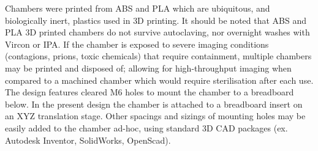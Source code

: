 Chambers were printed from ABS and PLA which are ubiquitous, and biologically inert, plastics used in \gls{3D printing}.
It should be noted that ABS and PLA 3D printed chambers do not survive autoclaving, nor overnight washes with Vircon or IPA.\@
If the chamber is exposed to severe imaging conditions (contagions, prions, toxic chemicals) that require containment, multiple chambers may be printed and disposed of; allowing for high-throughput imaging when compared to a machined chamber which would require sterilisation after each use.
The design features cleared M6 holes to mount the chamber to a breadboard below.
In the present design the chamber is attached to a breadboard insert on an XYZ translation stage.
Other spacings and sizings of mounting holes may be easily added to the chamber ad-hoc, using standard \gls{3D} \gls{CAD} packages (ex. Autodesk Inventor, SolidWorks, OpenScad).

